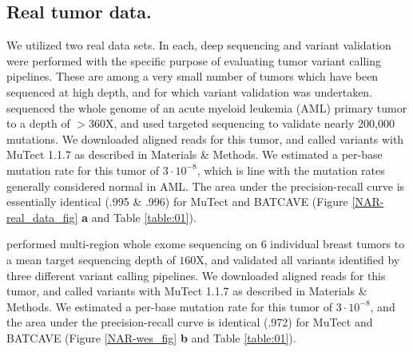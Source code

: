 \documentclass[a4,center,fleqn]{NAR}
\newcommand{\batcave}{BATCAVE }
\begin{document}
\subsection{Real tumor data.}
We utilized two real data sets.
In each, deep sequencing and variant validation were performed with the specific purpose of evaluating tumor variant calling pipelines.
These are among a very small number of tumors which have been sequenced at high depth, and for which variant validation was undertaken.
\citet{Griffith2015} sequenced the whole genome of an acute myeloid leukemia (AML) primary tumor to a depth of $>360\mathrm{X}$, and used targeted sequencing to validate nearly 200,000 mutations.
We downloaded aligned reads for this tumor, and called variants with MuTect 1.1.7 as described in Materials \& Methods.
We estimated a per-base mutation rate for this tumor of $3\cdot10^{-8}$, which is line with the mutation rates generally considered normal in AML.
The area under the precision-recall curve is essentially identical (.995 \& .996) for MuTect and \batcave (Figure \ref{NAR-real_data_fig} \textbf{a} and Table \ref{table:01}).

\citet{Shi2018} performed multi-region whole exome sequencing on 6 individual breast tumors to a mean target sequencing depth of $160\mathrm{X}$, and validated all variants identified by three different variant calling pipelines.
We downloaded aligned reads for this tumor, and called variants with MuTect 1.1.7 as described in Materials \& Methods.
We estimated a per-base mutation rate for this tumor of $3\cdot10^{-8}$, and the area under the precision-recall curve is identical (.972) for MuTect and \batcave (Figure \ref{NAR-wes_fig} \textbf{b} and Table \ref{table:01}).
\end{document}
